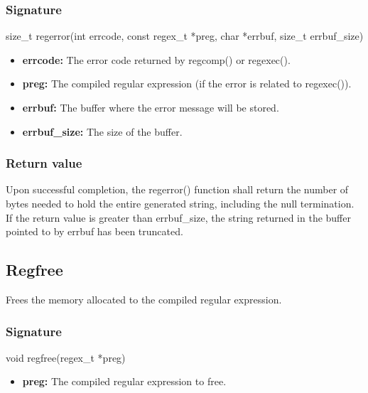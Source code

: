 \documentclass{report}
\begin{document}
    \subsubsection{Signature}
    \bigbreak \noindent 
    \begin{cppcode}
        size_t regerror(int errcode, const regex\_t *preg, char *errbuf, size\_t errbuf\_size)
    \end{cppcode}
    \begin{itemize}
        \item \textbf{errcode:} The error code returned by regcomp() or regexec().
        \item \textbf{preg:} The compiled regular expression (if the error is related to regexec()).
        \item \textbf{errbuf:} The buffer where the error message will be stored.
        \item \textbf{errbuf\_size:} The size of the buffer.
    \end{itemize}
    \bigbreak \noindent 
    \subsubsection{Return value}
    \bigbreak \noindent 
    Upon successful completion, the regerror() function shall return the number of bytes needed to hold the entire generated string, including the null termination. If the return value is greater than errbuf\_size, the string returned in the buffer pointed to by errbuf has been truncated.

    \bigbreak \noindent 
    \subsection{Regfree}
    \bigbreak \noindent 
    \begin{concept}
        Frees the memory allocated to the compiled regular expression.
    \end{concept}
    \bigbreak \noindent 
    \subsubsection{Signature}
    \bigbreak \noindent 
    \begin{cppcode}
        void regfree(regex_t *preg)
    \end{cppcode}
    \begin{itemize}
        \item \textbf{preg:} The compiled regular expression to free.
    \end{itemize}
    \bigbreak \noindent 
\end{document}
